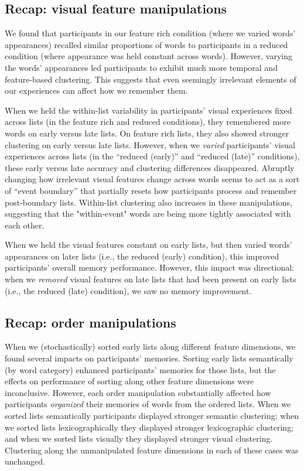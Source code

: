 \documentclass[11pt]{article}
\begin{document}
\subsection*{Recap: visual feature manipulations}

We found that participants in our feature rich condition (where we varied
words' appearances) recalled similar proportions of words to participants in a
reduced condition (where appearance was held constant across words). However,
varying the words' appearances led participants to exhibit much more temporal
and feature-based clustering. This suggests that even seemingly irrelevant
elements of our experiences can affect how we remember them.

When we held the within-list variability in participants' visual experiences
fixed across lists (in the feature rich and reduced conditions), they
remembered more words on early versus late lists. On feature rich lists, they
also showed stronger clustering on early versus late lists. However, when we
\textit{varied} participants' visual experiences across lists (in the ``reduced
(early)'' and ``reduced (late)'' conditions), these early versus late accuracy
and clustering differences disappeared. Abruptly changing how irrelevant visual
features change across words seems to act as a sort of ``event boundary'' that
partially resets how participants process and remember post-boundary lists.
Within-list clustering also increases in these manipulations, suggesting that
the "within-event" words are being more tightly associated with each other.

When we held the visual features constant on early lists, but then varied
words' appearances on later lists (i.e., the reduced (early) condition), this improved
participants' overall memory performance. However, this impact was directional:
when we \textit{removed} visual features on late lists that had been present on
early lists (i.e., the reduced (late) condition), we saw no memory improvement.

\subsection*{Recap: order manipulations}

When we (stochastically) sorted early lists along different feature dimensions,
we found several impacts on participants' memories. Sorting early lists
semantically (by word category) enhanced participants' memories for those
lists, but the effects on performance of sorting along other feature dimensions
were inconclusive. However, each order manipulation substantially affected how
participants \textit{organized} their memories of words from the ordered lists.
When we sorted lists semantically participants displayed stronger semantic
clustering; when we sorted lists lexicographically they displayed stronger
lexicographic clustering; and when we sorted lists visually they displayed
stronger visual clustering. Clustering along the unmanipulated feature
dimensions in each of these cases was unchanged.
\end{document}
